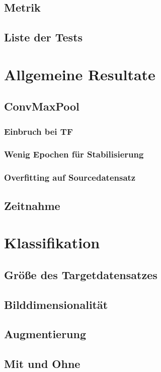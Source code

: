 \documentclass[ngerman]{report}
\begin{document}
    \section{Metrik}
    
    \section{Liste der Tests}
    

    \chapter{Allgemeine Resultate}  %
    \section{ConvMaxPool}
    
    \subsection{Einbruch bei TF}
    \subsection{Wenig Epochen für Stabilisierung}
    \subsection{Overfitting auf Sourcedatensatz}
    \section{Zeitnahme}

    \chapter{Klassifikation}  %
    \section{Größe des Targetdatensatzes}
    \section{Bilddimensionalität}
    \section{Augmentierung}
    \section{Mit und Ohne}
\end{document}
